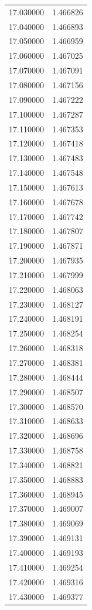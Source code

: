 \begin{tabular}{rr}
17.030000 & 1.466826 \\
17.040000 & 1.466893 \\
17.050000 & 1.466959 \\
17.060000 & 1.467025 \\
17.070000 & 1.467091 \\
17.080000 & 1.467156 \\
17.090000 & 1.467222 \\
17.100000 & 1.467287 \\
17.110000 & 1.467353 \\
17.120000 & 1.467418 \\
17.130000 & 1.467483 \\
17.140000 & 1.467548 \\
17.150000 & 1.467613 \\
17.160000 & 1.467678 \\
17.170000 & 1.467742 \\
17.180000 & 1.467807 \\
17.190000 & 1.467871 \\
17.200000 & 1.467935 \\
17.210000 & 1.467999 \\
17.220000 & 1.468063 \\
17.230000 & 1.468127 \\
17.240000 & 1.468191 \\
17.250000 & 1.468254 \\
17.260000 & 1.468318 \\
17.270000 & 1.468381 \\
17.280000 & 1.468444 \\
17.290000 & 1.468507 \\
17.300000 & 1.468570 \\
17.310000 & 1.468633 \\
17.320000 & 1.468696 \\
17.330000 & 1.468758 \\
17.340000 & 1.468821 \\
17.350000 & 1.468883 \\
17.360000 & 1.468945 \\
17.370000 & 1.469007 \\
17.380000 & 1.469069 \\
17.390000 & 1.469131 \\
17.400000 & 1.469193 \\
17.410000 & 1.469254 \\
17.420000 & 1.469316 \\
17.430000 & 1.469377 \\

\end{tabular}

